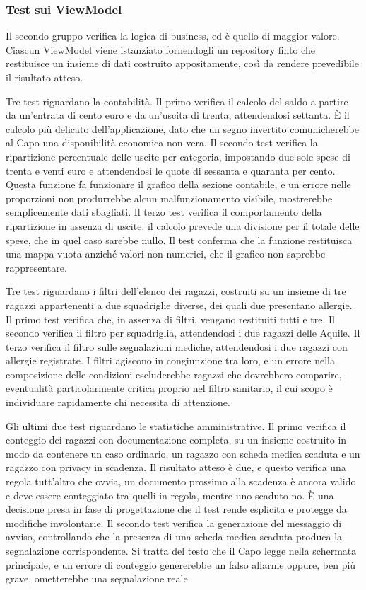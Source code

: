 \documentclass[11pt]{article}
\numberwithin{figure}{section}
\begin{document}
\subsubsection{Test sui ViewModel}

Il secondo gruppo verifica la logica di business, ed è quello di maggior valore. Ciascun ViewModel viene istanziato fornendogli un repository finto che restituisce un insieme di dati costruito appositamente, così da rendere prevedibile il risultato atteso.

Tre test riguardano la contabilità. Il primo verifica il calcolo del saldo a partire da un'entrata di cento euro e da un'uscita di trenta, attendendosi settanta. È il calcolo più delicato dell'applicazione, dato che un segno invertito comunicherebbe al Capo una disponibilità economica non vera. Il secondo test verifica la ripartizione percentuale delle uscite per categoria, impostando due sole spese di trenta e venti euro e attendendosi le quote di sessanta e quaranta per cento. Questa funzione fa funzionare il grafico della sezione contabile, e un errore nelle proporzioni non produrrebbe alcun malfunzionamento visibile, mostrerebbe semplicemente dati sbagliati. Il terzo test verifica il comportamento della ripartizione in assenza di uscite: il calcolo prevede una divisione per il totale delle spese, che in quel caso sarebbe nullo. Il test conferma che la funzione restituisca una mappa vuota anziché valori non numerici, che il grafico non saprebbe rappresentare.

Tre test riguardano i filtri dell'elenco dei ragazzi, costruiti su un insieme di tre ragazzi appartenenti a due squadriglie diverse, dei quali due presentano allergie. Il primo test verifica che, in assenza di filtri, vengano restituiti tutti e tre. Il secondo verifica il filtro per squadriglia, attendendosi i due ragazzi delle Aquile. Il terzo verifica il filtro sulle segnalazioni mediche, attendendosi i due ragazzi con allergie registrate. I filtri agiscono in congiunzione tra loro, e un errore nella composizione delle condizioni escluderebbe ragazzi che dovrebbero comparire, eventualità particolarmente critica proprio nel filtro sanitario, il cui scopo è individuare rapidamente chi necessita di attenzione.

Gli ultimi due test riguardano le statistiche amministrative. Il primo verifica il conteggio dei ragazzi con documentazione completa, su un insieme costruito in modo da contenere un caso ordinario, un ragazzo con scheda medica scaduta e un ragazzo con privacy in scadenza. Il risultato atteso è due, e questo verifica una regola tutt'altro che ovvia, un documento prossimo alla scadenza è ancora valido e deve essere conteggiato tra quelli in regola, mentre uno scaduto no. È una decisione presa in fase di progettazione che il test rende esplicita e protegge da modifiche involontarie. Il secondo test verifica la generazione del messaggio di avviso, controllando che la presenza di una scheda medica scaduta produca la segnalazione corrispondente. Si tratta del testo che il Capo legge nella schermata principale, e un errore di conteggio genererebbe un falso allarme oppure, ben più grave, ometterebbe una segnalazione reale.
\end{document}
